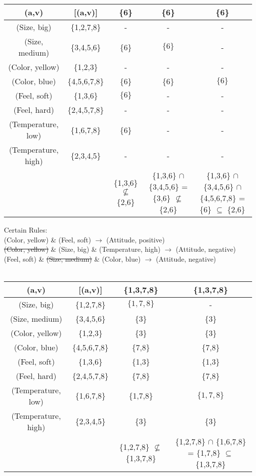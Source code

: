 \documentclass[10pt]{amsart}
\newcommand{\hl}[1]{%
  \colorbox{red!50}{$\displaystyle#1$}}
\begin{document}
\begin{center}
\begin{tabular}{ | c | c !{\vrule width 1pt } !{\vrule width 1pt} c | c | c |||}
\hline
(a,v) & [(a,v)] & \{6\}&\{6\}&\{6\}\\
\hline
(Size, big) & \{1,2,7,8\}        & -          & -          & -\\ 
(Size, medium) & \{3,4,5,6\}     & \{6\}      & \hl{\{6\}} & -\\  
(Color, yellow) & \{1,2,3\}      & -          & -          & -\\  
(Color, blue) & \{4,5,6,7,8\}    & \{6\}      & \{6\}      & \hl{\{6\}}\\ 
(Feel, soft) & \{1,3,6\}         & \hl{\{6\}} & -          & -\\ 
(Feel, hard) & \{2,4,5,7,8\}     & -          & -          & -\\ 
(Temperature, low) &\{1,6,7,8\}  & \{6\}      & -          & -\\
(Temperature, high) & \{2,3,4,5\}& -          & -          & -\\
\hline 
&& \{1,3,6\} $\nsubseteq$ \{2,6\} & \{1,3,6\} $\cap$ \{3,4,5,6\} = \{3,6\} $\nsubseteq$ \{2,6\} & \{1,3,6\} $\cap$ \{3,4,5,6\} $\cap$ \{4,5,6,7,8\} = \{6\} $\subseteq$ \{2,6\}
\end{tabular}

Certain Rules:\\
(Color, yellow) \& (Feel, soft) $\rightarrow$ (Attitude, positive)\\
\sout{(Color, yellow)} \& (Size, big) \& (Temperature, high) $\rightarrow$ (Attitude, negative)\\
(Feel, soft) \& \sout{(Size, medium)} \& (Color, blue) $\rightarrow$ (Attitude, negative)\\
\hfill\\
\begin{tabular}{ | c | c !{\vrule width 1pt } !{\vrule width 1pt} c | c !{\vrule width 1pt } !{\vrule width 1pt}}
\hline
(a,v) & [(a,v)] & \{1,3,7,8\} & \{1,3,7,8\} \\
\hline
(Size, big) & \{1,2,7,8\}        & \hl{\{1,7,8\}}& -             \\ 
(Size, medium) & \{3,4,5,6\}     & \{3\}         & \{3\}         \\  
(Color, yellow) & \{1,2,3\}      & \{3\}         & \{3\}         \\  
(Color, blue) & \{4,5,6,7,8\}    & \{7,8\}       & \{7,8\}       \\ 
(Feel, soft) & \{1,3,6\}         & \{1,3\}       & \{1,3\}       \\ 
(Feel, hard) & \{2,4,5,7,8\}     & \{7,8\}       & \{7,8\}       \\ 
(Temperature, low) &\{1,6,7,8\}  & \{1,7,8\}     & \hl{\{1,7,8\}}\\
(Temperature, high) & \{2,3,4,5\}& \{3\}         & \{3\}         \\
\hline 
&& \{1,2,7,8\} $\nsubseteq$ \{1,3,7,8\} & \{1,2,7,8\} $\cap$ \{1,6,7,8\} = \{1,7,8\} $\subseteq$ \{1,3,7,8\}
\end{tabular}


\end{center}
\end{document}
